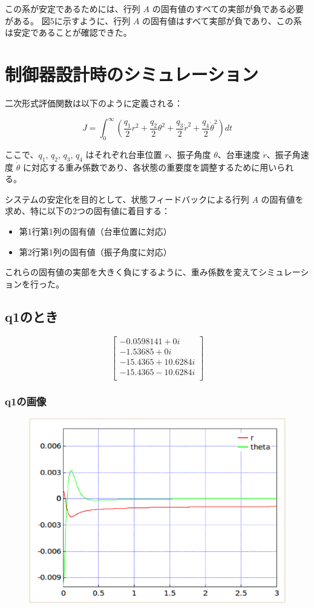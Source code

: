 \documentclass[10pt,a4paper,titlepage]{jreport} %
\begin{document}
この系が安定であるためには、行列 $A$ の固有値のすべての実部が負である必要がある。  
図5に示すように、行列 $A$ の固有値はすべて実部が負であり、この系は安定であることが確認できた。

\section{制御器設計時のシミュレーション}

二次形式評価関数は以下のように定義される：

\begin{equation}
J = \int_0^{\infty} \left( \frac{q_1}{2} r^2 + \frac{q_2}{2} \theta^2 + \frac{q_3}{2} \dot{r}^2 + \frac{q_4}{2} \dot{\theta}^2 \right) dt
\end{equation}

ここで、$q_1$, $q_2$, $q_3$, $q_4$ はそれぞれ台車位置 $r$、振子角度 $\theta$、台車速度 $\dot{r}$、振子角速度 $\dot{\theta}$ に対応する重み係数であり、各状態の重要度を調整するために用いられる。

システムの安定化を目的として、状態フィードバックによる行列 $A$ の固有値を求め、特に以下の2つの固有値に着目する：

\begin{itemize}
  \item 第1行第1列の固有値（台車位置に対応）
  \item 第2行第1列の固有値（振子角度に対応）
\end{itemize}

これらの固有値の実部を大きく負にするように、重み係数を変えてシミュレーションを行った。

\subsection{q1のとき}

\[
\begin{bmatrix}
-0.0598141 + 0i \\
-1.53685 + 0i \\
-15.4365 + 10.6284i \\
-15.4365 - 10.6284i \\
\end{bmatrix}
\]

\subsubsection{q1の画像}

\begin{figure}[H] %
  \centering
  \includegraphics[width=0.6\linewidth]{0400Src.eps} %
\end{figure}
\end{document}
